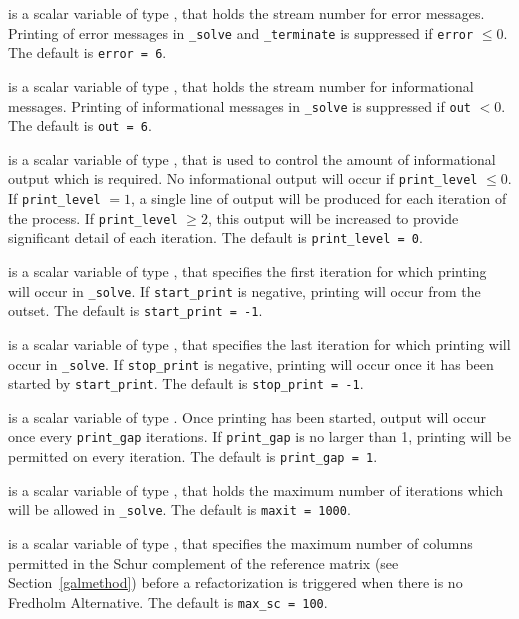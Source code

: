 \begin{description}

 is a scalar variable of type \integer, that holds the
stream number for error messages. Printing of error messages in
{\tt \packagename\_solve} and {\tt \packagename\_terminate} is suppressed if
{\tt error} $\leq 0$.
The default is {\tt error = 6}.

 is a scalar variable of type \integer, that holds the
stream number for informational messages. Printing of informational messages in
{\tt \packagename\_solve} is suppressed if {\tt out} $< 0$.
The default is {\tt out = 6}.

 is a scalar variable of type \integer, that is used
to control the amount of informational output which is required. No
informational output will occur if {\tt print\_level} $\leq 0$. If
{\tt print\_level} $= 1$, a single line of output will be produced for each
iteration of the process. If {\tt print\_level} $\geq 2$, this output will be
increased to provide significant detail of each iteration.
The default is {\tt print\_level = 0}.

 is a scalar variable of type \integer, that specifies
the first iteration for which printing will occur in {\tt \packagename\_solve}.
If {\tt start\_print} is negative, printing will occur from the outset.
The default is {\tt start\_print = -1}.

 is a scalar variable of type \integer, that specifies
the last iteration for which printing will occur in  {\tt \packagename\_solve}.
If {\tt stop\_print} is negative, printing will occur once it has been
started by {\tt start\_print}.
The default is {\tt stop\_print = -1}.

 is a scalar variable of type \integer.
Once printing has been started, output will occur once every
{\tt print\_gap} iterations. If {\tt print\_gap} is no larger than 1,
printing will be permitted on every iteration.
The default is {\tt print\_gap = 1}.

 is a scalar variable of type \integer, that holds the
maximum number of iterations which will be allowed in {\tt \packagename\_solve}.
The default is {\tt maxit = 1000}.

 is a scalar variable of type \integer, that specifies
the maximum number of columns permitted in the Schur complement of the
reference matrix (see Section~\ref{galmethod})
before a refactorization is triggered when there is no Fredholm Alternative.
The default is {\tt max\_sc = 100}.


\end{description}
